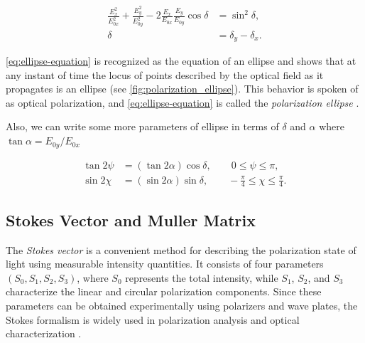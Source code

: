 \begin{subequations}\label{eq:polarization-ellipse}
\begin{align}
\frac{E_x^2}{E_{0x}^2}
+\frac{E_y^2}{E_{0y}^2}
-2\frac{E_x}{E_{0x}}\frac{E_y}{E_{0y}}\cos\delta
&=\sin^2\delta,
\label{eq:ellipse-equation}\\
\delta &= \delta_y-\delta_x.
\label{eq:phase-difference}
\end{align}
\end{subequations}

\cref{eq:ellipse-equation} is recognized as the equation of an ellipse and shows that at any instant of time the locus of points described by the optical field as it propagates is an ellipse (see \cref{fig:polarization_ellipse}). This behavior is spoken of as optical polarization, and \cref{eq:ellipse-equation} is called the \emph{polarization ellipse} \cite{Goldstein2003PolarizedLight}.

Also, we can write some more parameters of ellipse in terms of $\delta$ and $\alpha$ where $\tan{\alpha} = E_{0y}/E_{0x}$

\begin{subequations}
    \begin{align}
    \tan 2\psi &= (\tan 2\alpha)\cos\delta, 
    \qquad 0 \le \psi \le \pi, \\
    \sin 2\chi &= (\sin 2\alpha)\sin\delta,
    \qquad -\frac{\pi}{4} \le \chi \le \frac{\pi}{4}.
    \end{align}
\end{subequations}

\subsection{Stokes Vector and Muller Matrix}

The \emph{Stokes vector} is a convenient method for describing the polarization state of light using measurable intensity quantities. It consists of four parameters $(S_0, S_1, S_2, S_3)$, where $S_0$ represents the total intensity, while $S_1$, $S_2$, and $S_3$ characterize the linear and circular polarization components. Since these parameters can be obtained experimentally using polarizers and wave plates, the Stokes formalism is widely used in polarization analysis and optical characterization \cite{DuttaGupta2015WaveOptics}.

